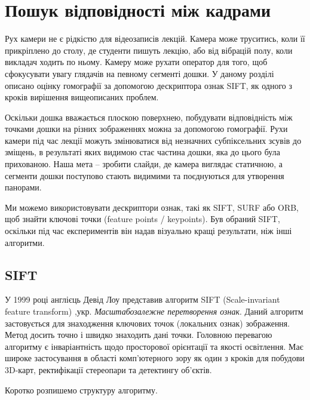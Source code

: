 \section{Пошук відповідності між кадрами}

Рух камери не є рідкістю для відеозаписів лекцій. Камера може труситись,
коли її прикріплено до столу, де студенти пишуть лекцію, або від
вібрацій полу, коли викладач ходить по ньому. Камеру може рухати
оператор для того, щоб сфокусувати увагу глядачів на певному сегменті
дошки. У даному розділі описано оцінку гомографії за допомогою
дескриптора ознак SIFT, як одного з кроків вирішення вищеописаних
проблем.

Оскільки дошка вважається плоскою поверхнею, побудувати відповідність
між точками дошки на різних зображеннях можна за допомогою гомографії.
Рухи камери під час лекції можуть змінюватися від незначних
субпіксельних зсувів до зміщень, в результаті яких видимою стає частина
дошки, яка до цього була прихованою. Наша мета -- зробити слайди, де
камера виглядає статичною, а сегменти дошки поступово стають видимими та
поєднуються для утворення панорами.

Ми можемо використовувати дескриптори ознак, такі як SIFT, SURF або ORB, 
щоб знайти ключові точки (feature points / keypoints). Був обраний SIFT, оскільки під час
експериментів він надав візуально кращі результати, ніж інші алгоритми.


\subsection{SIFT}

У 1999 році англієць Девід Лоу представив алгоритм SIFT (Scale-invariant feature transform)
\cite{sift}
,укр. \textit{Масштабозалежне перетворення ознак}. Даний алгоритм
застовується для знаходження ключових точок (локальних ознак) зображення. Метод досить точно
і швидко знаходить дані точки.
Головною перевагою алгоритму є інваріантність щодо просторової орієнтації та якості освітлення.
Має широке застосування в області комп'ютерного зору як один з кроків для побудови 3D-карт,
ректифікації стереопари та детектингу об'єктів.

Коротко розпишемо структуру алгоритму.

